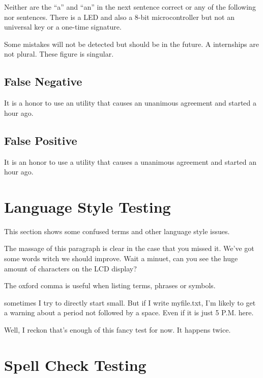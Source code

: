 \documentclass{scrartcl}
\begin{document}
Neither are the “a” and “an” in the next sentence correct or any of the following nor sentences.
There is a LED and also a 8-bit microcontroller but not an universal key or a one-time signature.

Some mistakes will not be detected but should be in the future.
A internships are not plural. These figure is singular.


\subsection{False Negative}
It is a honor to 
use an utility that
causes an unanimous agreement 
and started a hour ago.


\subsection{False Positive}
It is an honor to 
use a utility that
causes a unanimous agreement 
and started an hour ago.



\section{Language Style Testing}
This section shows some confused terms and other language style issues.

The massage of this paragraph is clear in the case that you missed it. We've got some words witch we should improve.
Wait a minuet, can you see the huge amount of characters on the LCD display? 

The oxford comma is useful when listing terms, phrases or symbols.

sometimes I try to directly start small. But if I write myfile.txt, I'm likely to get a warning about a period not followed by a space. Even if it is just 5 P.M. here.

Well, I reckon that's enough of this fancy test for now. It happens twice. 



\section{Spell Check Testing}
\end{document}
